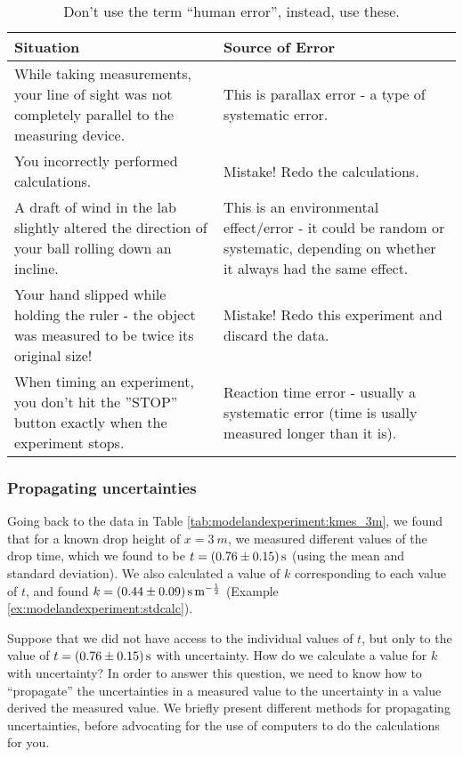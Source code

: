 \begin{table}[H]
\centering
\begin{tabular}{p{3in}p{3in}} 
\textbf{Situation} &\textbf{Source of Error} \\
\hline
\hline
While taking measurements, your line of sight was not completely parallel to the measuring device. & This is parallax error - a type of systematic error.\\ \hline
You incorrectly performed calculations. & Mistake! Redo the calculations.\\ \hline
A draft of wind in the lab slightly altered the direction of your ball rolling down an incline. & This is an environmental effect/error - it could be random or systematic, depending on whether it always had the same effect.\\ \hline
Your hand slipped while holding the ruler - the object was measured to be twice its original size! & Mistake! Redo this experiment and discard the data.\\ \hline
When timing an experiment, you don't hit the ''STOP'' button exactly when the experiment stops. & Reaction time error - usually a systematic error (time is usally measured longer than it is).\\ \hline
\end{tabular}
\caption{\label{tab:modelandexperiment:uncertainties} Don't use the term ``human error'', instead, use these.}
\end{table}

\subsubsection{Propagating uncertainties}
Going back to the data in Table \ref{tab:modelandexperiment:kmes_3m}, we found that for a known drop height of $x=\SI{3}{m}$, we measured different values of the drop time, which we found to be $t=\SI{0.76 \pm 0.15}{s}$ (using the mean and standard deviation). We also calculated a value of $k$ corresponding to each value of $t$, and found $k=\SI{0.44 \pm 0.09}{s.m^{-\frac{1}{2}}}$ (Example \ref{ex:modelandexperiment:stdcalc}).

Suppose that we did not have access to the individual values of $t$, but only to the value of $t=\SI{0.76 \pm 0.15}{s}$ with uncertainty. How do we calculate a value for $k$ with uncertainty? In order to answer this question, we need to know how to ``propagate'' the uncertainties in a measured value to the uncertainty in a value derived the measured value. We briefly present different methods for propagating uncertainties, before advocating for the use of computers to do the calculations for you.

